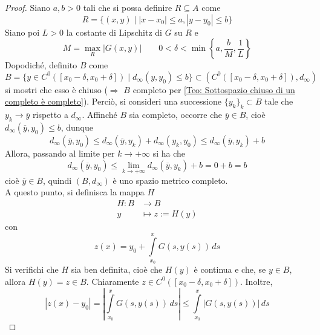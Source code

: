 \begin{proof}
Siano $a, b>0$ tali che si possa definire $R \subseteq A$ come
\begin{equation}
    R= \{(x,y) \mid |x-x_0|\leq a, |y-y_0| \leq b \}
\end{equation}
Siano poi $L>0$ la costante di Lipschitz di $G$ su $R$ e 
\begin{equation}
M=\max\limits_{R}{|G(x, y)|} \qquad 0<\delta<\min\left\{a, \frac{b}{M}, \frac{1}{L}\right\}
\end{equation}
Dopodiché, definito $B$ come
\begin{equation}
    B=\{y \in C^0([x_0-\delta, x_0+\delta]) \mid d_\infty(y, y_0) \leq b\} \subset (C^0([x_0-\delta, x_0+\delta]), d_\infty)
\end{equation}
si mostri che esso è chiuso ($\Rightarrow$ $B$ completo per \ref{Teo: Sottospazio chiuso di un completo è completo}).
Perciò, si consideri una successione $\{y_k\}_k \subset B$ tale che $y_k \to \overline{y}$ rispetto a $d_\infty$. Affinché $B$ sia completo, occorre che $\overline{y} \in B$, cioè $d_\infty(\overline{y},y_0)\leq b$, dunque
\begin{equation}
    d_\infty(\overline{y},y_0) \leq d_\infty(\overline{y},y_k)+ d_\infty(y_k,y_0) \leq d_\infty(\overline{y},y_k) +b
\end{equation}
Allora, passando al limite per $k \to +\infty$ si ha che
\begin{equation}
    d_\infty(\overline{y},y_0) \leq \lim_{k \to +\infty}{d_\infty(\overline{y},y_k) +b}= 0+b= b
\end{equation}
cioè $\overline{y} \in B$, quindi $(B, d_\infty)$ è uno spazio metrico completo.\\
A questo punto, si definisca la mappa $H$
\begin{equation}
    \begin{aligned}
        H: B &\to B\\
        y &\mapsto z:=H(y)
    \end{aligned}
\end{equation}
con
\begin{equation}
    z(x)=y_0+ \int\limits_{x_0}^{x}{G(s, y(s))}\,ds
\end{equation}
Si verifichi che $H$ sia ben definita, cioè che $H(y)$ è continua e che, se $y \in B$, allora $H(y)=z \in B$. Chiaramente $z \in C^0([x_0-\delta, x_0+\delta])$. Inoltre,
\begin{equation}
    |z(x)-y_0|=\left|\int\limits_{x_0}^{x}{G(s, y(s))}\,ds\right| \leq
\int\limits_{x_0}^{x}\left|{G(s, y(s))}\right|\,ds

\end{equation}
\end{proof}
